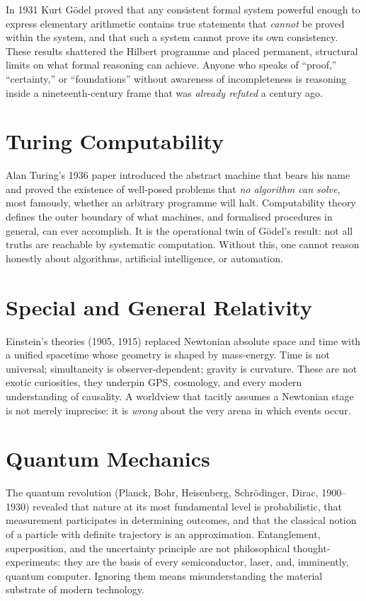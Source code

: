 In 1931 Kurt G\"odel proved that any consistent formal system powerful enough to express elementary arithmetic contains true statements that \emph{cannot} be proved within the system, and that such a system cannot prove its own consistency. These results shattered the Hilbert programme and placed permanent, structural limits on what formal reasoning can achieve. Anyone who speaks of ``proof,'' ``certainty,'' or ``foundations'' without awareness of incompleteness is reasoning inside a nineteenth-century frame that was \emph{already refuted} a century ago.

\section{Turing Computability}

Alan Turing's 1936 paper introduced the abstract machine that bears his name and proved the existence of well-posed problems that \emph{no algorithm can solve}, most famously, whether an arbitrary programme will halt. Computability theory defines the outer boundary of what machines, and formalised procedures in general, can ever accomplish. It is the operational twin of G\"odel's result: not all truths are reachable by systematic computation. Without this, one cannot reason honestly about algorithms, artificial intelligence, or automation.

\section{Special and General Relativity}

Einstein's theories (1905, 1915) replaced Newtonian absolute space and time with a unified spacetime whose geometry is shaped by mass-energy. Time is not universal; simultaneity is observer-dependent; gravity is curvature. These are not exotic curiosities, they underpin GPS, cosmology, and every modern understanding of causality. A worldview that tacitly assumes a Newtonian stage is not merely imprecise: it is \emph{wrong} about the very arena in which events occur.

\section{Quantum Mechanics}

The quantum revolution (Planck, Bohr, Heisenberg, Schr\"odinger, Dirac, 1900--1930) revealed that nature at its most fundamental level is probabilistic, that measurement participates in determining outcomes, and that the classical notion of a particle with definite trajectory is an approximation. Entanglement, superposition, and the uncertainty principle are not philosophical thought-experiments: they are the basis of every semiconductor, laser, and, imminently, quantum computer. Ignoring them means misunderstanding the material substrate of modern technology.

